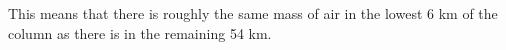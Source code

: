 \begin{solution}
This means that there is roughly the same mass of air in the lowest 6 km of the column as there is in the remaining 54 km.
\end{solution}

%
